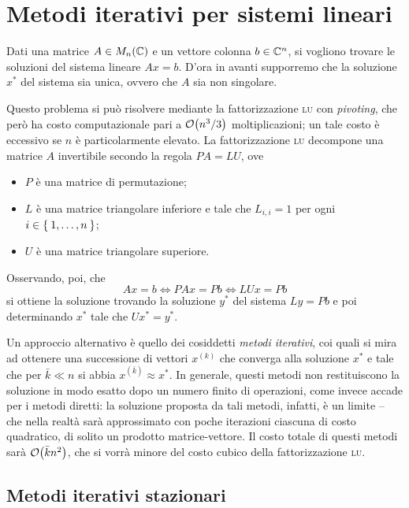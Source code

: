 \chapter{Metodi iterativi per sistemi lineari}

	\noindent Dati una matrice \(A \in M_n (\mathbb{C})\) e un vettore colonna \(b \in \mathbb{C}^n\), si vogliono trovare le soluzioni del sistema lineare \(A x = b\). D'ora in avanti supporremo che la soluzione \(x^*\) del sistema sia unica, ovvero che \(A\) sia non singolare.
	
	Questo problema si può risolvere mediante la fattorizzazione \textsc{lu} con \emph{pivoting}, che però ha costo computazionale pari a \(\order{n^3 / 3}\) moltiplicazioni; un tale costo è eccessivo se \(n\) è particolarmente elevato. La fattorizzazione \textsc{lu} decompone una matrice \(A\) invertibile secondo la regola \(P \! A = L U\), ove
		\begin{itemize}
			\item \(P\) è una matrice di permutazione;
			\item \(L\) è una matrice triangolare inferiore e tale che \(L_{i, i} = 1\) per ogni \(i \in \Set{1, \dots, n}\);
			\item \(U\) è una matrice triangolare superiore.
		\end{itemize}
	Osservando, poi, che
	\begin{equation*}
		A x = b \iff P \! A x = P b \iff L U x = P b
	\end{equation*}
	si ottiene la soluzione trovando la soluzione \(y^*\) del sistema \(L y = P b\) e poi determinando \(x^*\) tale che \(U x^* = y^*\).
	
	Un approccio alternativo è quello dei cosiddetti \emph{metodi iterativi}, coi quali si mira ad ottenere una successione di vettori \(x^{(k)}\) che converga alla soluzione \(x^*\) e tale che per \(\bar{k} \ll n\) si abbia \(x^{(\bar{k})} \approx x^*\). In generale, questi metodi non restituiscono la soluzione in modo esatto dopo un numero finito di operazioni, come invece accade per i metodi diretti: la soluzione proposta da tali metodi, infatti, è un limite -- che nella realtà sarà approssimato con poche iterazioni ciascuna di costo quadratico, di solito un prodotto matrice-vettore. Il costo totale di questi metodi sarà \(\order{\bar{k} n^2}\), che si vorrà minore del costo cubico della fattorizzazione \textsc{lu}.
	
\section{Metodi iterativi stazionari}
	
